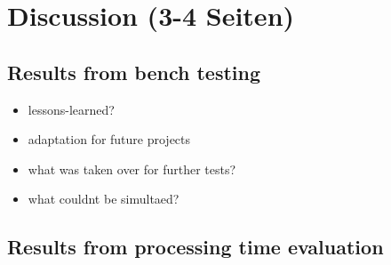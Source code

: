 \documentclass[ExampleMasters.tex]{subfiles}
\begin{document}
\clearpage
{\pagestyle{empty}\cleardoublepage}%
\chapter{Discussion (3-4 Seiten)}
\label{chap:discussion}

\section{Results from bench testing}
\label{sec:results_bench}

\begin{itemize}
	\item lessons-learned?
	\item adaptation for future projects
	\item what was taken over for further tests? 
	\item what couldnt be simultaed?
\end{itemize}

\section{Results from processing time evaluation}
\label{sec:results_processing_time}
\end{document}
